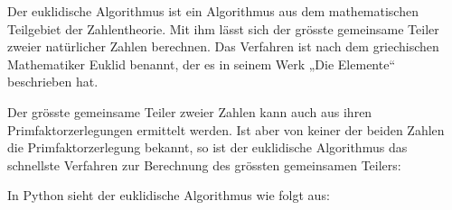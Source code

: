 
Der euklidische Algorithmus ist ein Algorithmus aus dem mathematischen Teilgebiet der Zahlentheorie. Mit ihm lässt sich der grösste gemeinsame Teiler zweier natürlicher Zahlen berechnen. Das Verfahren ist nach dem griechischen Mathematiker Euklid benannt, der es in seinem Werk „Die Elemente“ beschrieben hat.

\bigskip 

Der grösste gemeinsame Teiler zweier Zahlen kann auch aus ihren Primfaktorzerlegungen ermittelt werden. Ist aber von keiner der beiden Zahlen die Primfaktorzerlegung bekannt, so ist der euklidische Algorithmus das schnellste Verfahren zur Berechnung des grössten gemeinsamen Teilers: 

\bigskip 

In Python sieht der euklidische Algorithmus wie folgt aus:

\begin{quote}



\end{quote}
